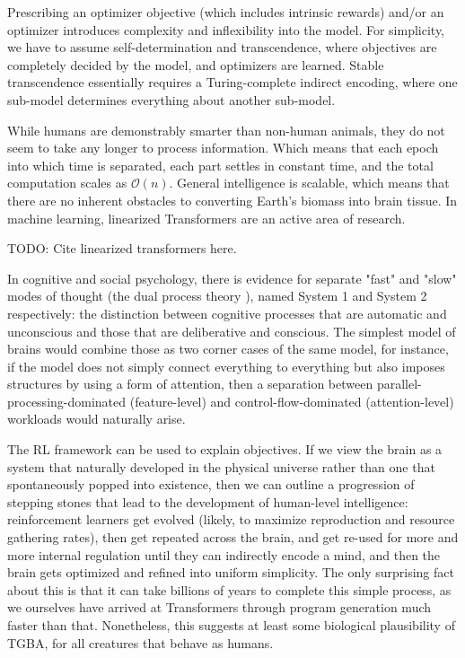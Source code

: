 \documentclass{article}
\begin{document}
Prescribing an optimizer objective (which includes intrinsic rewards) and/or an optimizer introduces complexity and inflexibility into the model. For simplicity, we have to assume self-determination and transcendence, where objectives are completely decided by the model, and optimizers are learned. Stable transcendence essentially requires a Turing-complete indirect encoding, where one sub-model determines everything about another sub-model.

While humans are demonstrably smarter than non-human animals, they do not seem to take any longer to process information. Which means that each epoch into which time is separated, each part settles in constant time, and the total computation scales as $\mathcal{O}(n)$. General intelligence is scalable, which means that there are no inherent obstacles to converting Earth's biomass into brain tissue. In machine learning, linearized Transformers are an active area of research.

    TODO: Cite linearized transformers here.

In cognitive and social psychology, there is evidence for separate "fast" and "slow" modes of thought (the dual process theory \cite{doi:10.1146/annurev.psych.59.103006.093629}), named System 1 and System 2 respectively: the distinction between cognitive processes that are automatic and unconscious and those that are deliberative and conscious. The simplest model of brains would combine those as two corner cases of the same model, for instance, if the model does not simply connect everything to everything but also imposes structures by using a form of attention, then a separation between parallel-processing-dominated (feature-level) and control-flow-dominated (attention-level) workloads would naturally arise.

The RL framework can be used to explain objectives. If we view the brain as a system that naturally developed in the physical universe rather than one that spontaneously popped into existence, then we can outline a progression of stepping stones that lead to the development of human-level intelligence: reinforcement learners get evolved (likely, to maximize reproduction and resource gathering rates), then get repeated across the brain, and get re-used for more and more internal regulation until they can indirectly encode a mind, and then the brain gets optimized and refined into uniform simplicity. The only surprising fact about this is that it can take billions of years to complete this simple process, as we ourselves have arrived at Transformers through program generation much faster than that. Nonetheless, this suggests at least some biological plausibility of TGBA, for all creatures that behave as humans.
\end{document}
